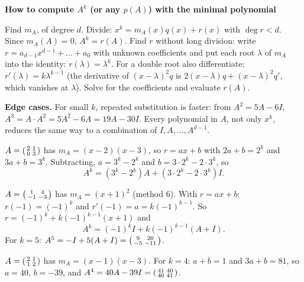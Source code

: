 \documentclass[10pt]{scrartcl}
\newenvironment{methodbox}[1]{\begin{mdframed}[style=mdbluebox,linecolor=NavyBlue,backgroundcolor=NavyBlue!3]\textbf{\color{NavyBlue}#1}\par\vspace{2pt}}{\end{mdframed}}
\begin{document}
\begin{methodbox}{How to compute $A^k$ (or any $p(A)$) with the minimal polynomial}
\begin{enumerate}[label=\arabic*.,leftmargin=1.5em,itemsep=2pt,topsep=2pt]
  \ii Find $m_A$, of degree $d$.
  \ii Divide: $x^k=m_A(x)q(x)+r(x)$ with $\deg r<d$. Since $m_A(A)=0$, $A^k=r(A)$.
  \ii Find $r$ without long division: write $r=a_{d-1}x^{d-1}+\dots+a_0$ with unknown coefficients and put each root $\lambda$ of $m_A$ into the identity: $r(\lambda)=\lambda^k$. For a double root also differentiate: $r'(\lambda)=k\lambda^{k-1}$ (the derivative of $(x-\lambda)^2q$ is $2(x-\lambda)q+(x-\lambda)^2q'$, which vanishes at $\lambda$).
  \ii Solve for the coefficients and evaluate $r(A)$.
\end{enumerate}
\textbf{Edge cases.} For small $k$, repeated substitution is faster: from $A^2=5A-6I$, $A^3=A\cdot A^2=5A^2-6A=19A-30I$. Every polynomial in $A$, not only $x^k$, reduces the same way to a combination of $I,A,\dots,A^{d-1}$.
\end{methodbox}

\begin{example*}
  $A=\begin{psmallmatrix}2&1\\0&3\end{psmallmatrix}$ has $m_A=(x-2)(x-3)$, so $r=ax+b$ with $2a+b=2^k$ and $3a+b=3^k$. Subtracting, $a=3^k-2^k$ and $b=3\cdot2^k-2\cdot3^k$, so
  \[ A^k=(3^k-2^k)A+(3\cdot2^k-2\cdot3^k)I. \]
\end{example*}

\begin{example*}
  $A=\begin{psmallmatrix}1&4\\-1&-3\end{psmallmatrix}$ has $m_A=(x+1)^2$ (method 6). With $r=ax+b$: $r(-1)=(-1)^k$ and $r'(-1)=a=k(-1)^{k-1}$. So $r=(-1)^k+k(-1)^{k-1}(x+1)$ and
  \[ A^k=(-1)^kI+k(-1)^{k-1}(A+I). \]
  For $k=5$: $A^5=-I+5(A+I)=\begin{psmallmatrix}9&20\\-5&-11\end{psmallmatrix}$.
\end{example*}

\begin{example*}
  $A=\begin{psmallmatrix}2&1\\1&2\end{psmallmatrix}$ has $m_A=(x-1)(x-3)$. For $k=4$: $a+b=1$ and $3a+b=81$, so $a=40$, $b=-39$, and $A^4=40A-39I=\begin{psmallmatrix}41&40\\40&41\end{psmallmatrix}$.
\end{example*}
\end{document}
